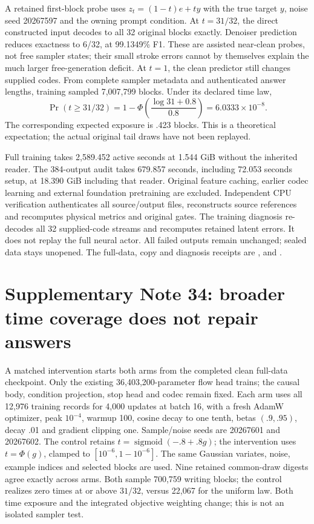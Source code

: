 \documentclass[10pt,a4paper]{article}
\begin{document}
A retained first-block probe uses $z_t=(1-t)e+ty$ with the true target $y$,
noise seed 20267597 and the owning prompt condition. At $t=31/32$, the direct
constructed input decodes to all 32 original blocks exactly. Denoiser
prediction reduces exactness to 6/32, at 99.1349\% F1. These are assisted
near-clean probes, not free sampler states; their small stroke errors cannot
by themselves explain the much larger free-generation deficit. At $t=1$,
the clean predictor still changes supplied codes. From complete sampler
metadata and authenticated answer lengths, training sampled 7,007,799 blocks.
Under its declared time law,
\begin{equation}
 \Pr(t\geq31/32)=1-\Phi\!\left(\frac{\log 31+0.8}{0.8}\right)
 =6.0333\times10^{-8}.
\end{equation}
The corresponding expected exposure is .423 blocks. This is a theoretical
expectation; the actual original tail draws have not been replayed.

Full training takes 2,589.452 active seconds at 1.544 GiB without the
inherited reader. The 384-output audit takes 679.857 seconds, including
72.053 seconds setup, at 18.390 GiB including that reader. Original feature
caching, earlier codec learning and external foundation pretraining are
excluded. Independent CPU verification authenticates all source/output
files, reconstructs source references and recomputes physical metrics and
original gates. The training diagnosis re-decodes all 32 supplied-code
streams and recomputes retained latent errors. It does not replay the full
neural actor. All failed outputs remain unchanged; sealed data stays unopened.
The full-data, copy and diagnosis receipts are
,
 and
.

\section*{Supplementary Note 34: broader time coverage does not repair answers}
A matched intervention starts both arms from the completed clean full-data
checkpoint. Only the existing 36,403,200-parameter flow head trains; the causal
body, condition projection, stop head and codec remain fixed. Each arm uses
all 12,976 training records for 4,000 updates at batch 16, with a fresh AdamW
optimizer, peak $10^{-4}$, warmup 100, cosine decay to one tenth, betas
$(.9,.95)$, decay .01 and gradient clipping one. Sample/noise seeds are
20267601 and 20267602. The control retains $t=\operatorname{sigmoid}(-.8+.8g)$;
the intervention uses $t=\Phi(g)$, clamped to $[10^{-6},1-10^{-6}]$.
The same Gaussian variates, noise, example indices and selected blocks are
used. Nine retained common-draw digests agree exactly across arms. Both
sample 700,759 writing blocks; the control realizes zero times at or above
$31/32$, versus 22,067 for the uniform law. Both time exposure and the
integrated objective weighting change; this is not an isolated sampler test.
\end{document}

